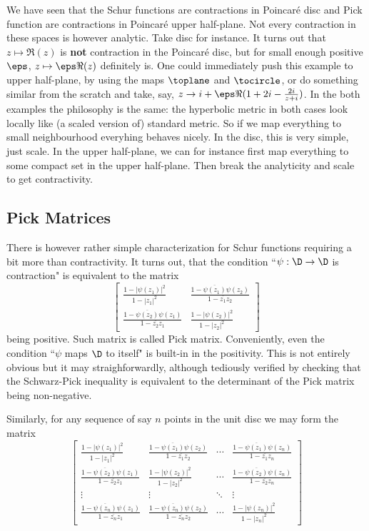 We have seen that the Schur functions are contractions in Poincaré disc and Pick function are contractions in Poincaré upper half-plane. Not every contraction in these spaces is however analytic. Take disc for instance. It turns out that $z \mapsto \Re(z)$ is \textbf{not} contraction in the Poincaré disc, but for small enough positive $\eps$, $z \mapsto \eps \Re(z)$ definitely is. One could immediately push this example to upper half-plane, by using the maps $\toplane$ and $\tocircle$, or do something similar from the scratch and take, say, $z \to i + \eps \Re(1 + 2 i - \frac{2 i}{z + i})$. In the both examples the philosophy is the same: the hyperbolic metric in both cases look locally like (a scaled version of) standard metric. So if we map everything to small neighbourhood everyhing behaves nicely. In the disc, this is very simple, just scale. In the upper half-plane, we can for instance first map everything to some compact set in the upper half-plane. Then break the analyticity and scale to get contractivity.

\subsection{Pick Matrices}

There is however rather simple characterization for Schur functions requiring a bit more than contractivity. It turns out, that the condition ``$\psi : \D \to \D$ is contraction" is equivalent to the matrix
\[
	\begin{bmatrix}
		\frac{1 - |\psi(z_{1})|^{2}}{1 - |z_{1}|^{2}} & \frac{1 - \overline{\psi(z_{1})} \psi(z_{2})}{1 - \overline{z_{1}} z_{2}} \\
		\frac{1 - \overline{\psi(z_{2})} \psi(z_{1})}{1 - \overline{z_{2}} z_{1}} & \frac{1 - |\psi(z_{2})|^{2}}{1 - |z_{2}|^{2}}
	\end{bmatrix}
\]
being positive. Such matrix is called Pick matrix. Conveniently, even the condition ``$\psi$ maps $\D$ to itself" is built-in in the positivity. This is not entirely obvious but it may straighforwardly, although tediously verified by checking that the Schwarz-Pick inequality is equivalent to the determinant of the Pick matrix being non-negative.

Similarly, for any sequence of say $n$ points in the unit disc we may form the matrix
\[
	\begin{bmatrix}
		\frac{1 - |\psi(z_{1})|^{2}}{1 - |z_{1}|^{2}} & \frac{1 - \overline{\psi(z_{1})} \psi(z_{2})}{1 - \overline{z_{1}} z_{2}} & \cdots & \frac{1 - \overline{\psi(z_{1})} \psi(z_{n})}{1 - \overline{z_{1}} z_{n}} \\
		\frac{1 - \overline{\psi(z_{2})} \psi(z_{1})}{1 - \overline{z_{2}} z_{1}} & \frac{1 - |\psi(z_{2})|^{2}}{1 - |z_{2}|^{2}} & \cdots & \frac{1 - \overline{\psi(z_{2})} \psi(z_{n})}{1 - \overline{z_{2}} z_{n}} \\
		\vdots & \vdots & \ddots & \vdots \\
		\frac{1 - \overline{\psi(z_{n})} \psi(z_{1})}{1 - \overline{z_{n}} z_{1}} & \frac{1 - \overline{\psi(z_{n})} \psi(z_{2})}{1 - \overline{z_{n}} z_{2}} & \cdots &  \frac{1 - |\psi(z_{n})|^{2}}{1 - |z_{n}|^{2}}
	\end{bmatrix}
\]

